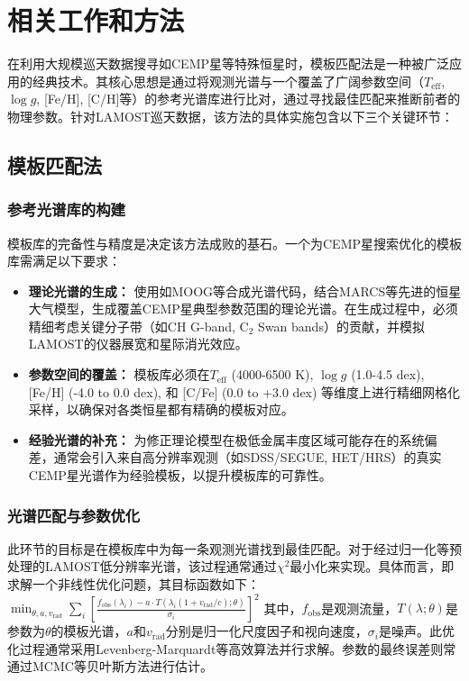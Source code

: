 \section{相关工作和方法}

在利用大规模巡天数据搜寻如CEMP星等特殊恒星时，模板匹配法是一种被广泛应用的经典技术。其核心思想是通过将观测光谱与一个覆盖了广阔参数空间（$T_{\text{eff}}$, $\log g$, [Fe/H], [C/H]等）的参考光谱库进行比对，通过寻找最佳匹配来推断前者的物理参数。针对LAMOST巡天数据，该方法的具体实施包含以下三个关键环节：
\subsection{模板匹配法}
\subsubsection{参考光谱库的构建}
模板库的完备性与精度是决定该方法成败的基石。一个为CEMP星搜索优化的模板库需满足以下要求：
\begin{itemize}
    \item \textbf{理论光谱的生成：} 使用如MOOG等合成光谱代码，结合MARCS等先进的恒星大气模型，生成覆盖CEMP星典型参数范围的理论光谱。在生成过程中，必须精细考虑关键分子带（如CH G-band, C$_2$ Swan bands）的贡献，并模拟LAMOST的仪器展宽和星际消光效应。
    \item \textbf{参数空间的覆盖：} 模板库必须在$T_{\text{eff}}$ (4000-6500 K), $\log g$ (1.0-4.5 dex), [Fe/H] (-4.0 to 0.0 dex), 和 [C/Fe] (0.0 to +3.0 dex) 等维度上进行精细网格化采样，以确保对各类恒星都有精确的模板对应。
    \item \textbf{经验光谱的补充：} 为修正理论模型在极低金属丰度区域可能存在的系统偏差，通常会引入来自高分辨率观测（如SDSS/SEGUE, HET/HRS）的真实CEMP星光谱作为经验模板，以提升模板库的可靠性。
\end{itemize}

\subsubsection{光谱匹配与参数优化}
此环节的目标是在模板库中为每一条观测光谱找到最佳匹配。对于经过归一化等预处理的LAMOST低分辨率光谱，该过程通常通过$\chi^2$最小化来实现。具体而言，即求解一个非线性优化问题，其目标函数如下：
$
\min_{\theta, a, v_{\text{rad}}} \sum_{i} \left[ \frac{f_{\text{obs}}(\lambda_i) - a \cdot T(\lambda_i(1+v_{\text{rad}}/c); \theta)}{\sigma_i} \right]^2
$
其中，$f_{\text{obs}}$是观测流量，$T(\lambda; \theta)$是参数为$\theta$的模板光谱，$a$和$v_{\text{rad}}$分别是归一化尺度因子和视向速度，$\sigma_i$是噪声。此优化过程通常采用Levenberg-Marquardt等高效算法并行求解。参数的最终误差则常通过MCMC等贝叶斯方法进行估计。

